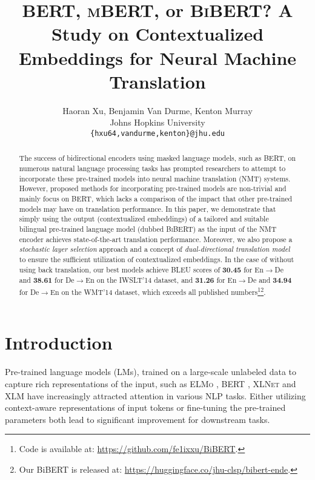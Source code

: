 \documentclass[11pt]{article}
\title{\textsc{BERT}, \textsc{mBERT}, or \textsc{BiBERT}? A Study on Contextualized Embeddings for Neural Machine Translation }
\author{Haoran Xu, Benjamin Van Durme,  Kenton Murray\\[1em]
Johns Hopkins University\\
\texttt{\{hxu64,vandurme,kenton\}@jhu.edu}\\[1em]
}
\date{}
\begin{document}
\maketitle
\begin{abstract}
The success of bidirectional encoders using masked language models, such as  \textsc{BERT}, on numerous natural language processing tasks has prompted researchers to attempt to incorporate these pre-trained models into neural machine translation (NMT) systems. However, proposed methods for incorporating pre-trained models are non-trivial and mainly focus on BERT, which lacks a comparison of the impact that other pre-trained models may have on translation performance. In this paper, we demonstrate that simply using the output (contextualized embeddings) of a tailored and suitable bilingual pre-trained language model (dubbed \textsc{BiBERT}) as the input of the NMT encoder achieves state-of-the-art translation performance. Moreover, we also propose a \textit{stochastic layer selection} approach and a concept of \textit{dual-directional translation model} to ensure the sufficient utilization of contextualized embeddings. In the case of without using back translation, our best models achieve BLEU scores of \textbf{30.45} for En$\rightarrow$De and \textbf{38.61} for De$\rightarrow$En on the IWSLT'14 dataset, and \textbf{31.26} for En$\rightarrow$De and \textbf{34.94} for De$\rightarrow$En on the WMT'14 dataset,  which exceeds all published numbers\footnote{Code is available at: \url{https://github.com/fe1ixxu/BiBERT}.}\footnote{Our BiBERT is released at: \url{https://huggingface.co/jhu-clsp/bibert-ende}.}. 
\end{abstract}

\section{Introduction}
Pre-trained language models (LMs), trained on a large-scale unlabeled data to capture rich representations of the input, such as \textsc{ELMo} \citep{peters-etal-2018-deep}, \textsc{BERT} \citep{devlin-etal-2019-bert}, \textsc{XLNet} \citep{NEURIPS2019_dc6a7e65} and \textsc{XLM} \citep{NEURIPS2019_c04c19c2} have increasingly attracted attention in various NLP tasks. Either utilizing context-aware representations of input tokens \citep{peters-etal-2018-deep} or fine-tuning the pre-trained parameters \citep{devlin-etal-2019-bert} both lead to significant improvement for downstream tasks. 
\end{document}
